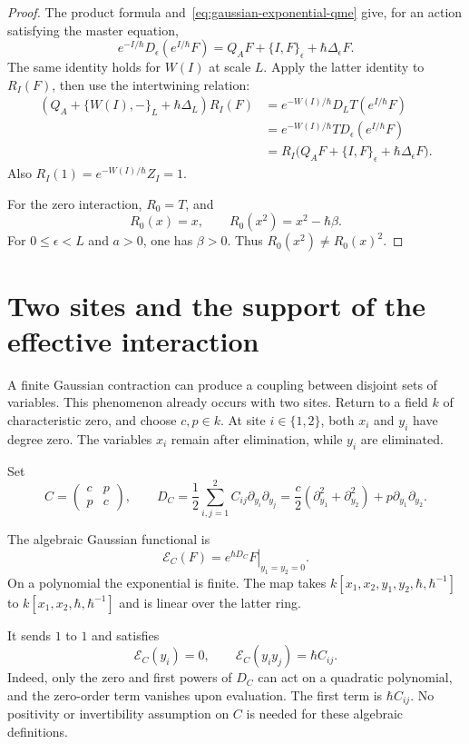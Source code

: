\begin{proof}
The product formula and~\eqref{eq:gaussian-exponential-qme} give,
for an action satisfying the master equation,
\[
 e^{-I/\hbar}D_\epsilon(e^{I/\hbar}F)
 =Q_AF+\{I,F\}_\epsilon+\hbar\Delta_\epsilon F.
\]
The same identity holds for $W(I)$ at scale $L$.
Apply the latter identity to $R_I(F)$, then use the intertwining relation:
\[
 \begin{split}
 (Q_A+\{W(I),-\}_L+\hbar\Delta_L)R_I(F)
 &=e^{-W(I)/\hbar}D_LT(e^{I/\hbar}F)\\
 &=e^{-W(I)/\hbar}T D_\epsilon(e^{I/\hbar}F)\\
 &=R_I\bigl(Q_AF+\{I,F\}_\epsilon+\hbar\Delta_\epsilon F\bigr).
 \end{split}
\]
Also $R_I(1)=e^{-W(I)/\hbar}Z_I=1$.

For the zero interaction, $R_0=T$, and
\[
 R_0(x)=x,\qquad R_0(x^2)=x^2-\hbar\beta.
\]
For $0\leq\epsilon<L$ and $a>0$, one has $\beta>0$.
Thus $R_0(x^2)\ne R_0(x)^2$.
\end{proof}

\section{Two sites and the support of the effective interaction}
\label{sec:gaussian-two-sites}

A finite Gaussian contraction can produce a coupling between disjoint
sets of variables. This phenomenon already occurs with two sites.
Return to a field $k$ of characteristic zero, and choose $c,p\in k$.
At site $i\in\{1,2\}$, both $x_i$ and $y_i$ have degree zero.
The variables $x_i$ remain after elimination, while $y_i$ are eliminated.

Set
\[
 C=\begin{pmatrix}c&p\\p&c\end{pmatrix},
 \qquad
 D_C=\frac12\sum_{i,j=1}^2C_{ij}\partial_{y_i}\partial_{y_j}
 =\frac c2(\partial_{y_1}^2+\partial_{y_2}^2)
                      +p\partial_{y_1}\partial_{y_2}.
\]

The algebraic Gaussian functional is
\[
 \mathcal E_C(F)=\left.e^{\hbar D_C}F\right|_{y_1=y_2=0}.
\]
On a polynomial the exponential is finite.
The map takes
$k[x_1,x_2,y_1,y_2,\hbar,\hbar^{-1}]$ to
$k[x_1,x_2,\hbar,\hbar^{-1}]$ and is linear over the latter ring.

It sends $1$ to $1$ and satisfies
\begin{equation}\label{eq:gaussian-covariance}
 \mathcal E_C(y_i)=0,
 \qquad \mathcal E_C(y_i y_j)=\hbar C_{ij}.
\end{equation}
Indeed, only the zero and first powers of $D_C$ can act on a quadratic
polynomial, and the zero-order term vanishes upon evaluation.
The first term is $\hbar C_{ij}$.
No positivity or invertibility assumption on $C$ is needed for these
algebraic definitions.

